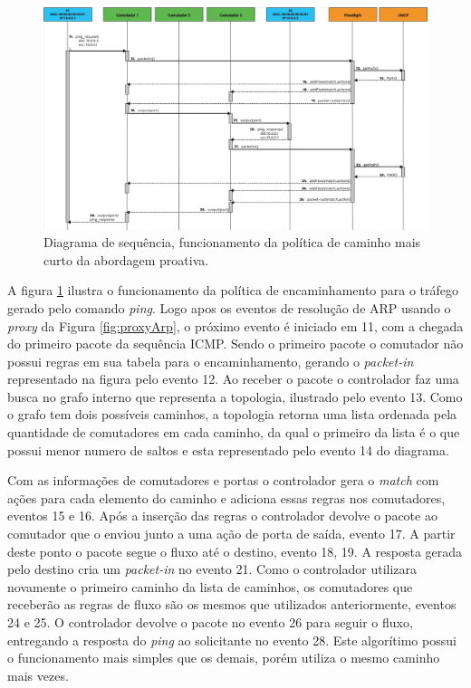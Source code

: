 \begin{figure}[htb!]
	\caption{\label{fig:pf} Diagrama de sequência, funcionamento da política de caminho mais curto da abordagem proativa.} 
	\begin{center}
	    \includegraphics[scale=0.43]{imagens/pf.jpg}
	\end{center}
\end{figure}
A figura \ref{fig:pf} ilustra o funcionamento da política de encaminhamento para o tráfego gerado pelo comando \emph{ping}. Logo apos os eventos de resolução de ARP usando o \textit{proxy} da Figura \ref{fig:proxyArp}, o próximo evento é iniciado em 11, com a chegada do primeiro pacote da sequência ICMP. Sendo o primeiro pacote o comutador não possui regras em sua tabela para o encaminhamento, gerando o \emph{packet-in} representado na figura pelo evento 12. Ao receber o pacote o controlador faz uma busca no grafo interno que representa a topologia, ilustrado pelo evento 13. Como o grafo tem dois possíveis caminhos, a topologia retorna uma lista ordenada pela quantidade de comutadores em cada caminho, da qual o primeiro da lista é o que possui menor numero de saltos e esta representado pelo evento 14 do diagrama. 

Com as informações de comutadores e portas o controlador gera o \emph{match} com ações para cada elemento do caminho e adiciona essas regras nos comutadores, eventos 15 e 16. Após a inserção das regras o controlador devolve o pacote ao comutador que o enviou junto a uma ação de porta de saída, evento 17. A partir deste ponto o pacote segue o fluxo até o destino, evento 18, 19. 
A resposta gerada pelo destino cria um \emph{packet-in} no evento 21. Como o controlador utilizara novamente o primeiro caminho da lista de caminhos, os comutadores que receberão as regras de fluxo são os mesmos que utilizados anteriormente, eventos 24 e 25. O controlador devolve o pacote no evento 26 para seguir o fluxo,  entregando a resposta do \emph{ping} ao solicitante no evento 28.  
Este algorítimo possui o funcionamento mais simples que os demais, porém utiliza o mesmo caminho mais vezes.



